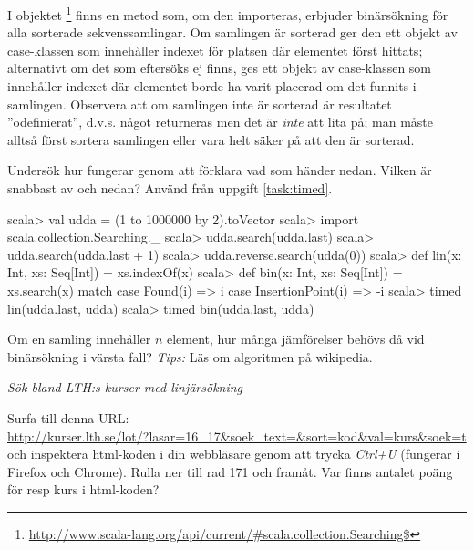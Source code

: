 I objektet \footnote{\href{http://www.scala-lang.org/api/current/\#scala.collection.Searching$}{http://www.scala-lang.org/api/current/\#scala.collection.Searching\$}} finns en metod  som, om den importeras, erbjuder binärsökning för alla sorterade sekvenssamlingar. Om samlingen är sorterad ger den ett objekt av case-klassen  som innehåller indexet för platsen där elementet först hittats; alternativt om det som eftersöks ej finns, ges ett objekt av case-klassen  som innehåller indexet där elementet borde ha varit placerad om det funnits i samlingen. Observera att om samlingen inte är sorterad är resultatet ''odefinierat'', d.v.s. något returneras men det är \emph{inte} att lita på; man måste alltså först sortera samlingen eller vara helt säker på att den är sorterad. 

Undersök hur  fungerar genom att förklara vad som händer nedan. Vilken är snabbast av  och  nedan? Använd  från uppgift \ref{task:timed}.

\begin{REPL}
scala> val udda = (1 to 1000000 by 2).toVector
scala> import scala.collection.Searching._
scala> udda.search(udda.last)
scala> udda.search(udda.last + 1)
scala> udda.reverse.search(udda(0))  
scala> def lin(x: Int, xs: Seq[Int]) = xs.indexOf(x)
scala> def bin(x: Int, xs: Seq[Int]) = xs.search(x) match {
         case Found(i) => i
         case InsertionPoint(i) => -i
       }
scala> timed{ lin(udda.last, udda) }
scala> timed{ bin(udda.last, udda) }
\end{REPL}

\Subtask\Pen Om en samling innehåller $n$ element, hur många jämförelser behövs då vid binärsökning i värsta fall? \emph{Tips:} Läs om algoritmen på wikipedia.







\Task \label{task:linsearch-lth}\emph{Sök bland LTH:s kurser med linjärsökning} 

\Subtask Surfa till denna URL:\\ {\nolinebreak[4]\footnotesize\url{http://kurser.lth.se/lot/?lasar=16_17&soek_text=&sort=kod&val=kurs&soek=t}}
\\
och inspektera html-koden i din webbläsare genom att trycka \emph{Ctrl+U} (fungerar i Firefox och Chrome). Rulla ner till rad 171 och framåt. Var finns antalet poäng för resp kurs i html-koden?

